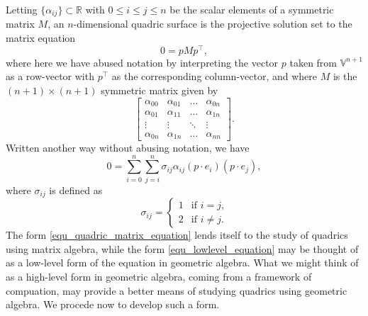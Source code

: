 \documentclass{ecgd-l}
\theoremstyle{definition}
\theoremstyle{remark}
\numberwithin{equation}{section}
\newcommand{\V}{\mathbb{V}}
\newcommand{\R}{\mathbb{R}}
\begin{document}
Letting $\{\alpha_{ij}\}\subset\R$ with $0\leq i\leq j\leq n$ be the scalar elements of a symmetric
matrix $M$, an $n$-dimensional quadric surface is the projective solution set to the
matrix equation
\begin{equation}\label{equ_quadric_matrix_equation}
0 = pMp^\intercal,
\end{equation}
where here we have abused notation by interpreting the vector $p$ taken from $\V^{n+1}$ as
a row-vector with $p^\intercal$ as the corresponding column-vector, and where $M$ is the
$(n+1)\times(n+1)$ symmetric matrix given by
\begin{equation}
\left[\begin{array}{cccc}
\alpha_{00} & \alpha_{01} & \dots & \alpha_{0n} \\
\alpha_{01} & \alpha_{11} & \dots & \alpha_{1n} \\
\vdots & \vdots & \ddots & \vdots \\
\alpha_{0n} & \alpha_{1n} & \dots & \alpha_{nn}
\end{array}\right].
\end{equation}
Written another way without abusing notation, we have
\begin{equation}\label{equ_lowlevel_equation}
0 = \sum_{i=0}^n\sum_{j=i}^n\sigma_{ij}\alpha_{ij}(p\cdot e_i)(p\cdot e_j),
\end{equation}
where $\sigma_{ij}$ is defined as
\begin{equation}
\sigma_{ij} = \left\{\begin{array}{ll}
1 & \mbox{if $i=j$,} \\
2 & \mbox{if $i\neq j$.}
\end{array}\right.
\end{equation}
The form \eqref{equ_quadric_matrix_equation} lends itself to the study
of quadrics using matrix algebra, while the form \eqref{equ_lowlevel_equation}
may be thought of as a low-level form of the equation in geometric algebra.
What we might think of as a high-level form in geometric algebra, coming from
a framework of compuation, may provide a better means of studying quadrics
using geometric algebra.  We procede now to develop such a form.
\end{document}
